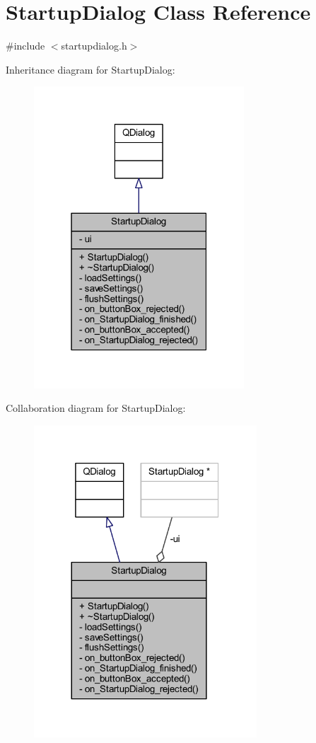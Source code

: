 \hypertarget{classStartupDialog}{}\section{Startup\+Dialog Class Reference}
\label{classStartupDialog}


{\ttfamily \#include $<$startupdialog.\+h$>$}



Inheritance diagram for Startup\+Dialog\+:
\nopagebreak
\begin{figure}[H]
\begin{center}
\leavevmode
\includegraphics[width=223pt]{classStartupDialog__inherit__graph}
\end{center}
\end{figure}


Collaboration diagram for Startup\+Dialog\+:
\nopagebreak
\begin{figure}[H]
\begin{center}
\leavevmode
\includegraphics[width=236pt]{classStartupDialog__coll__graph}
\end{center}
\end{figure}
